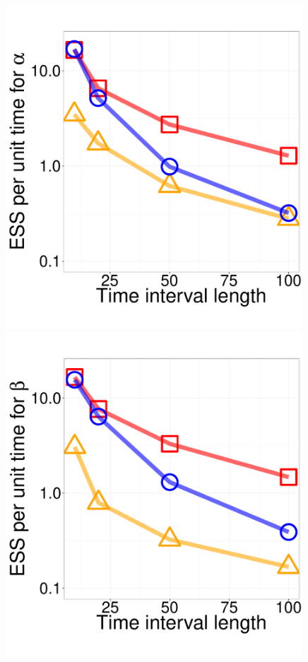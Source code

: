   \begin{figure}%
  \centering
  \begin{minipage}[hp]{0.24\linewidth}
  \centering
    \includegraphics [width=0.99\textwidth, angle=0]{figs/ESS_vs_t_alpha_fixobservation.pdf}
    \end{minipage}
  \begin{minipage}[hp]{0.24\linewidth}
  \centering
    \includegraphics [width=0.99\textwidth, angle=0]{figs/ESS_vs_t_beta_fixobservation.pdf}

\end{minipage}
\end{figure}
